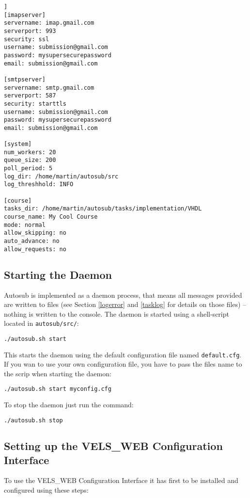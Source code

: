 \begin{lstlisting}[frame=single,captionpos=b,caption=example.cfg, belowcaptionskip=4pt]]
[imapserver]
servername: imap.gmail.com
serverport: 993
security: ssl
username: submission@gmail.com
password: mysupersecurepassword
email: submission@gmail.com

[smtpserver]
servername: smtp.gmail.com
serverport: 587
security: starttls
username: submission@gmail.com
password: mysupersecurepassword
email: submission@gmail.com

[system]
num_workers: 20
queue_size: 200
poll_period: 5
log_dir: /home/martin/autosub/src
log_threshhold: INFO

[course]
tasks_dir: /home/martin/autosub/tasks/implementation/VHDL
course_name: My Cool Course
mode: normal
allow_skipping: no
auto_advance: no
allow_requests: no
\end{lstlisting}

\subsection{Starting the Daemon}

Autosub is implemented as a daemon process, that means all messages provided are written
to files (see Section \ref{logerror} and \ref{tasklog} for details on those files) -- 
nothing is written to the console. The daemon is started using a shell-script located
in {\tt autosub/src/}:

\begin{verbatim}
./autosub.sh start
\end{verbatim}

This starts the daemon using the default configuration file named {\tt default.cfg}. If you
wan to use your own configuration file, you have to pass the files name to the scrip when
starting the daemon:

\begin{verbatim}
./autosub.sh start myconfig.cfg
\end{verbatim}

To stop the daemon just run the command:

\begin{verbatim}
./autosub.sh stop
\end{verbatim}

\subsection{Setting up the VELS\_WEB Configuration Interface}
To use the VELS\_WEB Configuration Interface it has first to be installed and
configured using these steps:

